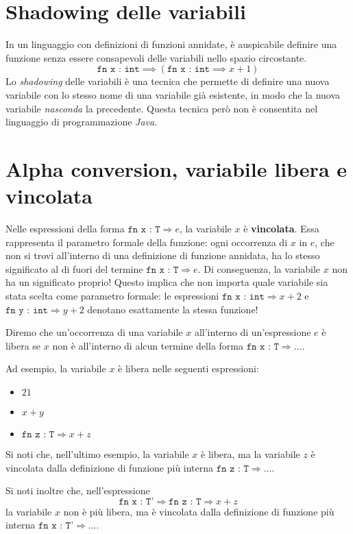 \section{Shadowing delle variabili}
In un linguaggio con definizioni di funzioni annidate,
è auspicabile definire una funzione senza essere consapevoli delle variabili
nello spazio circostante.
\[
  \texttt{fn x : int} \implies (\texttt{fn x : int} \implies x + 1)
\]
Lo \textit{shadowing} delle variabili è una tecnica che permette di definire
una nuova variabile con lo stesso nome di una variabile già esistente, in modo
che la nuova variabile \textit{nasconda} la precedente. Questa tecnica però non 
è consentita nel linguaggio di programmazione \textit{Java}.
\section{Alpha conversion, variabile libera e vincolata}
Nelle espressioni della forma $\texttt{fn x : T} \Rightarrow e$, la variabile $x$ è
\textbf{vincolata}. Essa rappresenta il parametro formale della funzione:
ogni occorrenza di $x$ in $e$, che non si trovi all'interno di una definizione
di funzione annidata, ha lo stesso significato al di fuori del termine
$\texttt{fn x : T} \Rightarrow e$. Di conseguenza, la variabile $x$ non ha un
significato proprio! Questo implica che non importa quale variabile sia stata
scelta come parametro formale: le espressioni $\texttt{fn x : int} \Rightarrow x+2$ e $\texttt{fn y : int}
\Rightarrow y+2$ denotano esattamente la stessa funzione!

Diremo che un'occorrenza di una variabile $x$ all'interno di un'espressione
$e$ è libera se $x$ non è all'interno di alcun termine della forma $\texttt{fn x : T}\Rightarrow \dots$.

Ad esempio, la variabile $x$ è libera nelle seguenti espressioni: 
\begin{itemize}
    \item $21$
    \item $x+y$
    \item $\texttt{fn z : T}\Rightarrow x+z$
\end{itemize}

Si noti che, nell'ultimo esempio, la variabile $x$ è libera,
ma la variabile $z$ è vincolata dalla definizione di funzione
più interna $\texttt{fn z : T}\Rightarrow...$. 

Si noti inoltre che, nell'espressione 
\[
    \texttt{fn x : T'}\Rightarrow \texttt{fn z : T}\Rightarrow x+z
\]
la variabile $x$ non è più libera, ma è vincolata dalla definizione di funzione
più interna $\texttt{fn x : T'}\Rightarrow...$.

